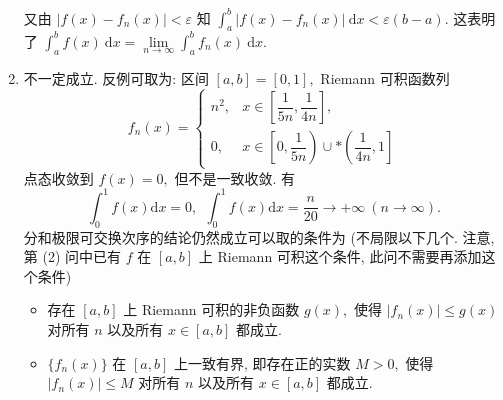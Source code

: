 \begin{solution}
\begin{enumerate}
又由 $\lvert f(x) - f_n(x) \rvert < \varepsilon$ 知 $\int_a^b \lvert f(x) - f_n(x) \rvert ~ \mathrm{d} x < \varepsilon (b - a).$ 这表明了 $\int_a^b f(x) ~ \mathrm{d} x = \lim\limits_{n\to\infty} \int_a^b f_n(x) ~ \mathrm{d} x.$
\item 不一定成立. 反例可取为: 区间 $[a, b] = [0, 1],$ Riemann 可积函数列
$$f_n(x) = \begin{cases}
n^2, & x \in \left[ \dfrac{1}{5n}, \dfrac{1}{4n} \right], \\
0, & x \in \left[0, \dfrac{1}{5n} \right) \cup* \left(\dfrac{1}{4n}, 1 \right]
\end{cases}$$
点态收敛到 $f(x) = 0,$ 但不是一致收敛. 有
$$\int_0^1 f(x) \mathrm{d} x = 0, ~~ \int_0^1 f(x) \mathrm{d} x = \dfrac{n}{20} \to +\infty ~ (n \to \infty).$$
分和极限可交换次序的结论仍然成立可以取的条件为 (不局限以下几个. 注意, 第 (2) 问中已有 $f$ 在 $[a, b]$ 上 Riemann 可积这个条件, 此问不需要再添加这个条件)
\begin{itemize}
\item 存在 $[a, b]$ 上 Riemann 可积的非负函数 $g(x),$ 使得 $\lvert f_n(x) \rvert \leqslant g(x)$ 对所有 $n$ 以及所有 $x \in [a, b]$ 都成立.
\item $\{f_n(x)\}$ 在 $[a, b]$ 上一致有界, 即存在正的实数 $M > 0,$ 使得 $\lvert f_n(x) \rvert \leqslant M$ 对所有 $n$ 以及所有 $x \in [a, b]$ 都成立.
\end{itemize}
\end{enumerate}
\end{solution}


